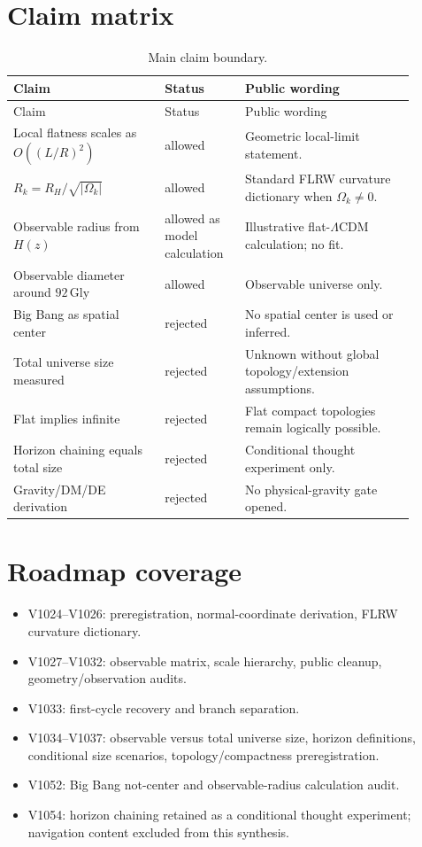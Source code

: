 \documentclass[11pt,a4paper]{article}
\newcommand{\Gly}{\,\mathrm{Gly}}
\begin{document}
\section{Claim matrix}
\begin{longtable}{p{0.34\linewidth}p{0.18\linewidth}p{0.38\linewidth}}
\caption{Main claim boundary.}\\
\toprule
Claim & Status & Public wording\\
\midrule
\endfirsthead
\toprule
Claim & Status & Public wording\\
\midrule
\endhead
Local flatness scales as $O((L/R)^2)$ & allowed & Geometric local-limit statement.\\
$R_k=R_H/\sqrt{|\Omega_k|}$ & allowed & Standard FLRW curvature dictionary when $\Omega_k\ne0$.\\
Observable radius from $H(z)$ & allowed as model calculation & Illustrative flat-$\Lambda$CDM calculation; no fit.\\
Observable diameter around $92\Gly$ & allowed & Observable universe only.\\
Big Bang as spatial center & rejected & No spatial center is used or inferred.\\
Total universe size measured & rejected & Unknown without global topology/extension assumptions.\\
Flat implies infinite & rejected & Flat compact topologies remain logically possible.\\
Horizon chaining equals total size & rejected & Conditional thought experiment only.\\
Gravity/DM/DE derivation & rejected & No physical-gravity gate opened.\\
\bottomrule
\end{longtable}

\section{Roadmap coverage}
\begin{itemize}
    \item V1024--V1026: preregistration, normal-coordinate derivation, FLRW curvature dictionary.
    \item V1027--V1032: observable matrix, scale hierarchy, public cleanup, geometry/observation audits.
    \item V1033: first-cycle recovery and branch separation.
    \item V1034--V1037: observable versus total universe size, horizon definitions, conditional size scenarios, topology/compactness preregistration.
    \item V1052: Big Bang not-center and observable-radius calculation audit.
    \item V1054: horizon chaining retained as a conditional thought experiment; navigation content excluded from this synthesis.
\end{itemize}
\end{document}
